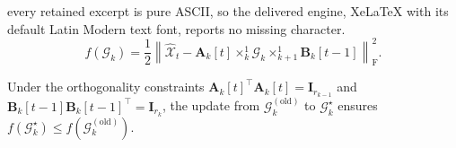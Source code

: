 \documentclass[10pt,a4paper]{amsart}
\newcommand{\ttimes}[2]{\times_{#1}^{#2}}
\begin{document}
every retained excerpt is pure ASCII, so the delivered engine, XeLaTeX with its default Latin Modern text font, reports no missing character.
\begin{equation}
    f(\mathcal{G}_k) = \frac{1}{2} \left\| \widehat{\mathcal{X}}_t - \mathbf{A}_k[t] \ttimes{k}{1} \mathcal{G}_k \ttimes{k+1}{1} \mathbf{B}_k[t-1] \right\|_\mathrm{F}^2. \label{eq:proposed-objective-matrix}
\end{equation}

\begin{proposition}[Monotonicity]
    \label{prop:monotonic_convergence}
    Under the orthogonality constraints $\mathbf{A}_k[t]^\top \mathbf{A}_k[t] = \mathbf{I}_{r_{k-1}}$ and $\mathbf{B}_k[t-1] \mathbf{B}_k[t-1]^\top = \mathbf{I}_{r_k}$, the update from $\mathcal{G}_k^{(\text{old})}$ to $\mathcal{G}_k^\star$ ensures $f(\mathcal{G}_k^\star) \leq f(\mathcal{G}_k^{(\text{old})})$.
\end{proposition}
\end{document}
